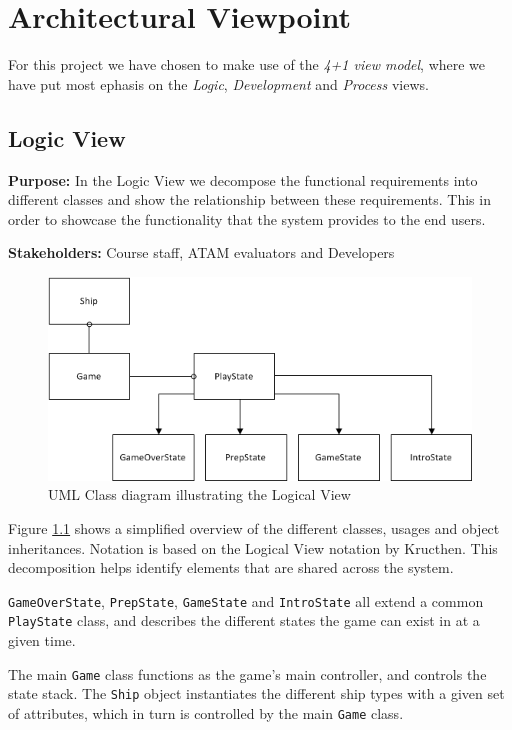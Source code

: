\chapter{Architectural Viewpoint}
For this project we have chosen to make use of the \emph{4+1 view model}, where we have put most ephasis on the \emph{Logic}, \emph{Development} and \emph{Process} views.

    \section{Logic View}
    \textbf{Purpose:} In the Logic View we decompose the functional requirements into different classes and show the relationship between these requirements. This in order to showcase the functionality that the system provides to the end users.

    
    
    \noindent\textbf{Stakeholders:} Course staff, ATAM evaluators and Developers 
    
    
    \begin{figure}[ht]
        \includegraphics[width=\textwidth]{LogicalView.png}
        \caption{UML Class diagram illustrating the Logical View}
        \label{fig:LogicalView}
    \end{figure}


    Figure \ref{fig:LogicalView} shows a simplified overview of the different classes, usages and object inheritances. Notation is based on the Logical View notation by Kructhen\cite{kruchten}. This decomposition helps identify elements that are shared across the system.

    \texttt{GameOverState}, \texttt{PrepState}, \texttt{GameState} and \texttt{IntroState} all extend a common \texttt{PlayState} class, and describes the different states the game can exist in at a given time.

    The main \texttt{Game} class functions as the game's main controller, and controls the state stack. The \texttt{Ship} object instantiates the different ship types with a given set of attributes, which in turn is controlled by the main \texttt{Game} class.

